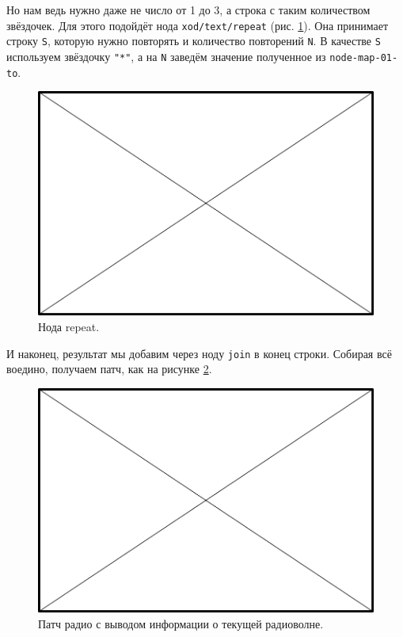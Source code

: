 Но нам ведь нужно даже не число от 1 до 3, а строка с таким количеством звёздочек. Для этого подойдёт нода \texttt{xod/text/repeat} (рис. \ref{patch:node-repeat}). Она принимает строку \texttt{S}, которую нужно повторять и количество повторений \texttt{N}. В качестве \texttt{S} используем звёздочку \texttt{"*"}, а на \texttt{N} заведём значение полученное из \texttt{node-map-01-to}.

\begin{figure}
  \centering
  \includegraphics{TODO}
  \caption{Нода repeat.}
  \label{patch:node-repeat}
\end{figure}

И наконец, результат мы добавим через ноду \texttt{join} в конец строки. Собирая всё воедино, получаем патч, как на рисунке \ref{patch:fm-lcd-line-1}.

\begin{figure}
  \centering
  \includegraphics{TODO}
  \caption{Патч радио с выводом информации о текущей радиоволне.}
  \label{patch:fm-lcd-line-1}
\end{figure}

